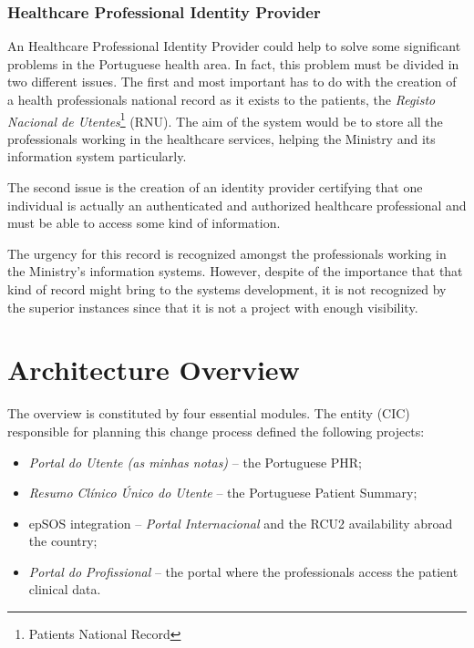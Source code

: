 \subsubsection{Healthcare Professional Identity Provider}\label{sec:hpip}

An Healthcare Professional Identity Provider could help to solve some significant problems in the Portuguese health area. In fact, this problem must be divided in two different issues. The first and most important has to do with the creation of a health professionals national record as it exists to the patients, the \textit{Registo Nacional de Utentes}\footnote{Patients National Record} (RNU). The aim of the system would be to store all the professionals working in the healthcare services, helping the Ministry and its information system particularly.

The second issue is the creation of an identity provider certifying that one individual is actually an authenticated and authorized healthcare professional and must be able to access some kind of information.

The urgency for this record is recognized amongst the professionals working in the Ministry's information systems. However, despite of the importance that that kind of record might bring to the systems development, it is not recognized by the superior instances since that it is not a project with enough visibility.





\section{Architecture Overview}

The overview is constituted by four essential modules. The entity (CIC) responsible for planning this change process defined the following projects:
\begin{itemize}
\item \textit{Portal do Utente (as minhas notas)} -- the Portuguese PHR;
\item \textit{Resumo Clínico Único do Utente} -- the Portuguese Patient Summary;
\item epSOS integration -- \textit{Portal Internacional} and the RCU2 availability abroad the country;
\item \textit{Portal do Profissional} -- the portal where the professionals access the patient clinical data.
\end{itemize}

